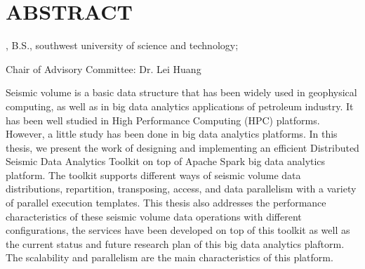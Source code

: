 %
%
%

\chapter*{ABSTRACT}

\pagestyle{plain} %
\setcounter{page}{2}

\begin{center}
\pvamumanuscripttitle

\pvamugradmonth \hspace{2pt} \pvamugradyear

\pvamufullname, B.S., southwest university of science and technology;

Chair of Advisory Committee: Dr. Lei Huang 

\par\end{center}

\indent Seismic volume is a basic data structure that has been widely used in geophysical computing, as well as in big data analytics applications of petroleum industry. It has been well studied in High Performance Computing (HPC) platforms. However, a little study has been done in big data analytics platforms. In this thesis, we present the work of designing and implementing an efficient Distributed Seismic Data Analytics Toolkit on top of Apache Spark big data analytics platform. The toolkit supports different ways of seismic volume data distributions, repartition, transposing, access, and data parallelism with a variety of parallel execution templates. This thesis also addresses the performance characteristics of these seismic volume data operations with different configurations, the services have been developed on top of this toolkit as well as the current status and future research plan of this big data analytics plaftorm. The scalability and parallelism are the main characteristics of this platform.  


 

\pagebreak{}
